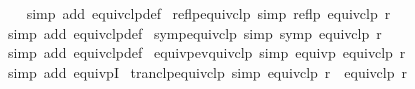 \begin{isabellebody}
%
\isadelimproof
\ \ %
\endisadelimproof
%
\isatagproof
{}\isamarkupfalse%
{\isacharparenleft}{\kern0pt}simp\ add{\isacharcolon}{\kern0pt}\ equivclp{\isacharunderscore}{\kern0pt}def{\isacharparenright}{\kern0pt}%
\endisatagproof
{\isafoldproof}%
%
\isadelimproof
\isanewline
%
\endisadelimproof
\isanewline
{}\isamarkupfalse%
\ reflp{\isacharunderscore}{\kern0pt}equivclp\ {\isacharbrackleft}{\kern0pt}simp{\isacharbrackright}{\kern0pt}{\isacharcolon}{\kern0pt}\ {\isachardoublequoteopen}reflp\ {\isacharparenleft}{\kern0pt}equivclp\ r{\isacharparenright}{\kern0pt}{\isachardoublequoteclose}\isanewline
%
\isadelimproof
\ \ %
\endisadelimproof
%
\isatagproof
{}\isamarkupfalse%
{\isacharparenleft}{\kern0pt}simp\ add{\isacharcolon}{\kern0pt}\ equivclp{\isacharunderscore}{\kern0pt}def{\isacharparenright}{\kern0pt}%
\endisatagproof
{\isafoldproof}%
%
\isadelimproof
\isanewline
%
\endisadelimproof
\isanewline
{}\isamarkupfalse%
\ symp{\isacharunderscore}{\kern0pt}equivclp\ {\isacharbrackleft}{\kern0pt}simp{\isacharbrackright}{\kern0pt}{\isacharcolon}{\kern0pt}\ {\isachardoublequoteopen}symp\ {\isacharparenleft}{\kern0pt}equivclp\ r{\isacharparenright}{\kern0pt}{\isachardoublequoteclose}\isanewline
%
\isadelimproof
\ \ %
\endisadelimproof
%
\isatagproof
{}\isamarkupfalse%
{\isacharparenleft}{\kern0pt}simp\ add{\isacharcolon}{\kern0pt}\ equivclp{\isacharunderscore}{\kern0pt}def{\isacharparenright}{\kern0pt}%
\endisatagproof
{\isafoldproof}%
%
\isadelimproof
\isanewline
%
\endisadelimproof
\isanewline
{}\isamarkupfalse%
\ equivp{\isacharunderscore}{\kern0pt}evquivclp\ {\isacharbrackleft}{\kern0pt}simp{\isacharbrackright}{\kern0pt}{\isacharcolon}{\kern0pt}\ {\isachardoublequoteopen}equivp\ {\isacharparenleft}{\kern0pt}equivclp\ r{\isacharparenright}{\kern0pt}{\isachardoublequoteclose}\isanewline
%
\isadelimproof
\ \ %
\endisadelimproof
%
\isatagproof
{}\isamarkupfalse%
{\isacharparenleft}{\kern0pt}simp\ add{\isacharcolon}{\kern0pt}\ equivpI{\isacharparenright}{\kern0pt}%
\endisatagproof
{\isafoldproof}%
%
\isadelimproof
\isanewline
%
\endisadelimproof
\isanewline
{}\isamarkupfalse%
\ tranclp{\isacharunderscore}{\kern0pt}equivclp\ {\isacharbrackleft}{\kern0pt}simp{\isacharbrackright}{\kern0pt}{\isacharcolon}{\kern0pt}\ {\isachardoublequoteopen}{\isacharparenleft}{\kern0pt}equivclp\ r{\isacharparenright}{\kern0pt}\isactrlsup {\isacharplus}{\kern0pt}\isactrlsup {\isacharplus}{\kern0pt}\ {\isacharequal}{\kern0pt}\ equivclp\ r{\isachardoublequoteclose}\isanewline

\end{isabellebody}

